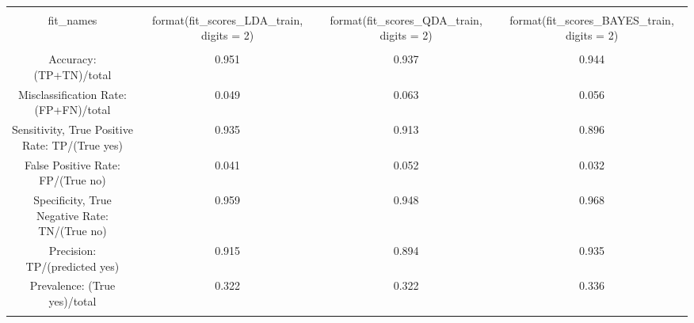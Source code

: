 
\begin{table}[!htbp] \centering 
  \caption{} 
  \label{} 
\begin{tabular}{@{\extracolsep{5pt}} cccc} 
\\[-1.8ex]\hline 
\hline \\[-1.8ex] 
fit\_names & format(fit\_scores\_LDA\_train, digits = 2) & format(fit\_scores\_QDA\_train, digits = 2) & format(fit\_scores\_BAYES\_train, digits = 2) \\ 
\hline \\[-1.8ex] 
Accuracy: (TP+TN)/total & 0.951 & 0.937 & 0.944 \\ 
Misclassification Rate: (FP+FN)/total & 0.049 & 0.063 & 0.056 \\ 
Sensitivity, True Positive Rate: TP/(True yes) & 0.935 & 0.913 & 0.896 \\ 
False Positive Rate: FP/(True no) & 0.041 & 0.052 & 0.032 \\ 
Specificity, True Negative Rate: TN/(True no) & 0.959 & 0.948 & 0.968 \\ 
Precision: TP/(predicted yes) & 0.915 & 0.894 & 0.935 \\ 
Prevalence: (True yes)/total & 0.322 & 0.322 & 0.336 \\ 
\hline \\[-1.8ex] 
\end{tabular} 
\end{table} 
